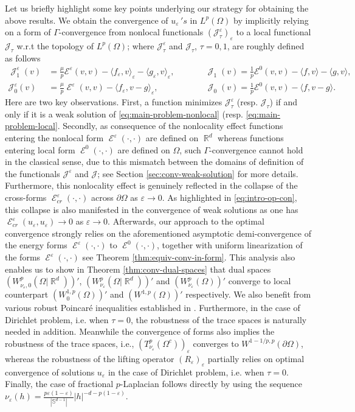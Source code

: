 \documentclass[12pt, reqno]{amsart}%
\theoremstyle{plain}  %
\theoremstyle{definition}  %
\numberwithin{equation}{section}
\DeclareMathOperator{\cE}{\mathcal{E}}
\DeclareMathOperator{\cJ}{\mathcal{J}}
\DeclareMathOperator{\R}{\mathbb{R}}
\newcommand{\eps}{\varepsilon}
\newcommand{\WnuOmRa}{W^p_{\nu_\eps}(\Omega|\R^d )}
\newcommand{\TnuOma}{T^p_{\nu_\eps} (\Omega^c)}
\newcommand{\WnuOma}{W^{p}_{\nu_\eps}(\Omega)}
\begin{document}
\noindent Let us briefly highlight some key points underlying our strategy for obtaining the above results. We obtain the convergence of $u_\eps {\,'}s$ in $L^p(\Omega)$ by implicitly relying on a form of $\Gamma$-convergence from nonlocal functionals $(\mathcal{J}^\eps_\tau )_\eps$ to a local functional $\mathcal{J}_\tau$ w.r.t the topology of $L^p(\Omega)$; where  $\mathcal{J}^\eps_\tau$  and $\mathcal{J}_\tau$, $\tau=0,1$, are roughly defined as follows
\begin{align*}
 \cJ^\eps_1(v)&=\frac{\mu}{p}  \mathcal{E}^\eps(v,v) -\langle f_\eps, v \rangle_\eps - \langle g_\eps, v\rangle_\eps,
&& \qquad\cJ_1(v)=\frac{1}{p}\mathcal{E}^0(v,v)-  \langle f, v\rangle- \langle g, v\rangle,\\
\mathcal{J}^\eps_0(v)
&= \frac{\mu}{p}  \cE^\eps(v,v)-\langle f_\eps , v-g \rangle_\eps, &&\qquad \cJ_0(v)=\frac{1}{p}\mathcal{E}^0(v,v) -\langle f ,v-g\rangle.
\end{align*}
\noindent Here are two key observations.  First, a function minimizes $\mathcal{J}^\varepsilon_\tau$ (resp. $\mathcal{J}_\tau$) if and only if it is a weak solution of \eqref{eq:main-problem-nonlocal} (resp.  \eqref{eq:main-problem-local}.
Secondly, as consequence of the nonlocality effect functions entering the nonlocal form $\cE^\eps(\cdot,\cdot)$ are defined on $\R^d$ whereas functions entering local form $\cE^0(\cdot,\cdot)$ are defined on $\Omega$,  such $\Gamma$-convergence cannot hold in the classical sense, due to this mismatch between the domains of definition of the functionals $\mathcal{J}^\eps$ and $\mathcal{J}$; see Section \ref{sec:conv-weak-solution} for more details. Furthermore, this nonlocality effect is genuinely reflected in the collapse of the cross-forms $\cE^\eps_{cr}(\cdot,\cdot)$ across $\partial\Omega$ as $\eps \to 0$. As highlighted in \eqref{eq:intro-op-con}, this collapse is also manifested in the convergence of weak solutions as one has $\cE^\eps_{cr}(u_\eps,u_\eps) \to 0$ as $\eps \to 0$. Afterwards, our approach to the optimal convergence strongly relies on the aforementioned asymptotic demi-convergence of the energy forms $\cE^\eps(\cdot,\cdot)$ to  $\cE^0(\cdot,\cdot)$, together with uniform linearization of the forms $\cE^\eps(\cdot,\cdot)$  see Theorem  \ref{thm:equiv-conv-in-form}.  This analysis also enables us to show  in Theorem \ref{thm:conv-dual-spaces} that dual spaces $(W^p_{\nu_\eps,0} (\Omega|\R^d))'$, $(\WnuOmRa)'$  and $(\WnuOma)'$ converge to local counterpart $ (W^{1,p}_0(\Omega))'$ and  $ (W^{1,p}(\Omega))'$ respectively. We also benefit from various robust Poincar{\'e} inequalities established in \cite{Fog25}.
Furthermore, in the case of Dirichlet problem, i.e. when $\tau=0$,  the robustness of the trace spaces is naturally needed in addition.  Meanwhile  the convergence of forms also implies the robustness of the trace spaces, i.e., $(\TnuOma)_\eps$ converges to $W^{1-1/p,p}(\partial\Omega)$, whereas the robustness of the lifting operator  $(R_\eps)_\eps$ partially relies on optimal convergence of solutions $u_\eps$ in the case of Dirichlet problem, i.e. when $\tau=0$. Finally, the case of fractional $p$-Laplacian follows directly by using the sequence
$\nu_\eps(h)=\tfrac{p\eps(1-\eps)}{|\mathbb{S}^{d-1}|}|h|^{-d-p(1-\eps)}$.
\end{document}
